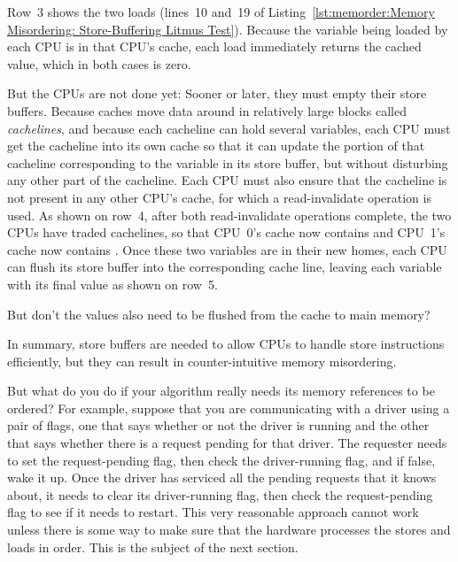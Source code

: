 Row~3 shows the two loads (lines~10 and~19 of
Listing~\ref{lst:memorder:Memory Misordering: Store-Buffering Litmus Test}).
Because the variable being loaded by each CPU is in that CPU's cache,
each load immediately returns the cached value, which in both cases
is zero.

But the CPUs are not done yet: Sooner or later, they must empty their
store buffers.
Because caches move data around in relatively large blocks called
\emph{cachelines}, and because each cacheline can hold several
variables, each CPU must get the cacheline into its own cache so
that it can update the portion of that cacheline corresponding
to the variable in its store buffer, but without disturbing any
other part of the cacheline.
Each CPU must also ensure that the cacheline is not present in any other
CPU's cache, for which a read-invalidate operation is used.
As shown on row~4, after both read-invalidate operations complete,
the two CPUs have traded cachelines, so that CPU~0's cache now contains
 and CPU~1's cache now contains .
Once these two variables are in their new homes, each CPU can flush
its store buffer into the corresponding cache line, leaving each
variable with its final value as shown on row~5.

\QuickQuiz{}
	But don't the values also need to be flushed from the cache
	to main memory?
 \QuickQuizEnd

In summary, store buffers are needed to allow CPUs to handle
store instructions efficiently, but they can result in
counter-intuitive memory misordering.

But what do you do if your algorithm really needs its memory
references to be ordered?
For example, suppose that you are communicating with a driver using
a pair of flags, one that says whether or not the driver is running
and the other that says whether there is a request pending for that
driver.
The requester needs to set the request-pending flag, then check
the driver-running flag, and if false, wake it up.
Once the driver has serviced all the pending requests that it knows about,
it needs to clear its driver-running flag, then check the request-pending
flag to see if it needs to restart.
This very reasonable approach cannot work unless there is some way
to make sure that the hardware processes the stores and loads in order.
This is the subject of the next section.

